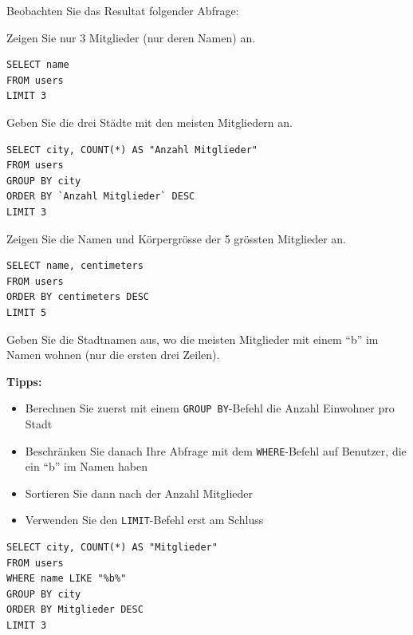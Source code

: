 Beobachten Sie das Resultat folgender Abfrage:

\begin{myexercise}
  Zeigen Sie nur 3 Mitglieder (nur deren Namen) an.
  \begin{myanswer}
    \begin{lstlisting}
SELECT name
FROM users
LIMIT 3
\end{lstlisting}
  \end{myanswer}
\end{myexercise}

\begin{myexercise}
  Geben Sie die drei Städte mit den meisten Mitgliedern an.
  \begin{myanswer}
    \begin{lstlisting}
SELECT city, COUNT(*) AS "Anzahl Mitglieder"
FROM users
GROUP BY city
ORDER BY `Anzahl Mitglieder` DESC
LIMIT 3
\end{lstlisting}
  \end{myanswer}
\end{myexercise}

\begin{myexercise}
  Zeigen Sie die Namen und Körpergrösse der 5 grössten Mitglieder an.
  \begin{myanswer}
    \begin{lstlisting}
SELECT name, centimeters
FROM users
ORDER BY centimeters DESC
LIMIT 5
\end{lstlisting}
  \end{myanswer}
\end{myexercise}

\begin{mychallenge}
  Geben Sie die Stadtnamen aus, wo die meisten Mitglieder mit einem \enquote{b} im Namen wohnen (nur die ersten drei Zeilen).

  \textbf{Tipps:}
  \begin{itemize}
    \item Berechnen Sie zuerst mit einem \lstinline|GROUP BY|-Befehl die Anzahl Einwohner pro Stadt
    \item Beschränken Sie danach Ihre Abfrage mit dem \lstinline|WHERE|-Befehl auf Benutzer, die ein \enquote{b} im Namen haben
    \item Sortieren Sie dann nach der Anzahl Mitglieder
    \item Verwenden Sie den \lstinline|LIMIT|-Befehl erst am Schluss
  \end{itemize}

  \begin{myanswer}
    \begin{lstlisting}
SELECT city, COUNT(*) AS "Mitglieder"
FROM users 
WHERE name LIKE "%b%" 
GROUP BY city 
ORDER BY Mitglieder DESC
LIMIT 3
\end{lstlisting}
  \end{myanswer}
\end{mychallenge}


